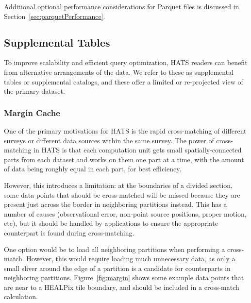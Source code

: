 \documentclass[11pt,a4paper]{ivoa}
\begin{document}
Additional optional performance considerations for Parquet files is discussed in Section~\ref{sec:parquetPerformance}.

\subsection{Supplemental Tables} \label{sec:supplemental}

To improve scalability and efficient query optimization, HATS readers can benefit from alternative arrangements of the data. 
We refer to these as supplemental tables or supplemental catalogs, and these offer a limited or re-projected view of the primary dataset.

\subsubsection{Margin Cache} \label{sec:margin}

One of the primary motivations for HATS is the rapid cross-matching of different surveys or different data sources within the same survey. 
The power of cross-matching in HATS is that each computation unit gets small spatially-connected parts from each dataset and works on them one part at a time,
with the amount of data being roughly equal in each part, for best efficiency.\par 

However, this introduces a limitation: at the boundaries of a divided section, some data points that should be cross-matched will be missed because they are present just across the border in neighboring partitions instead.
This has a number of causes (observational error, non-point source positions, proper motion, etc), but it should be handled by applications to ensure the appropriate counterpart is found during cross-matching.\par

One option would be to load all neighboring partitions when performing a cross-match. 
However, this would require loading much unnecessary data, as only a small sliver around the edge of a partition is a candidate for counterparts in neighboring partitions. 
Figure~\ref{fig:margin} shows some example data points that are near to a HEALPix tile boundary, and should be included in a cross-match calculation.
\end{document}
